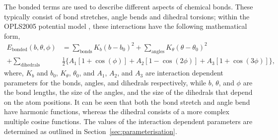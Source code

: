 The bonded terms are used to describe different aspects of chemical bonds.
These typically consist of bond stretches, angle bends and dihedral torsions; within the OPLS2005 potential model \cite{banks_integrated_2005}, these interactions have the following mathematical form,
%
\begin{equation}
\begin{aligned}
  E_{\text{bonded}}(b, \theta, \phi) & = \sum_{\text{bonds}}K_b(b-b_0)^2 + \sum_{\text{angles}}K_{\theta}(\theta-\theta_0)^2 \\
  + \sum_{\text{dihedrals}} & \frac{1}{2}\big\{A_1[1 + \cos(\phi)] + A_2[1 - \cos(2\phi)] + A_3[1 + \cos(3\phi)]\big\},
\end{aligned}
\end{equation}
%
where, $K_b$ and $b_0$, $K_{\theta}$, $\theta_0$, and $A_1$, $A_2$, and $A_3$ are interaction dependent parameters for the bonds, angles, and dihedrals respectively, while $b$, $\theta$, and $\phi$ are the bond lengths, the size of the angles, and the size of the dihedrals that depend on the atom positions.
It can be seen that both the bond stretch and angle bend have harmonic functions, whereas the dihedral consists of a more complex multiple cosine functions.
The values of the interaction dependent parameters are determined as outlined in Section~\ref{sec:parameterisation}.

